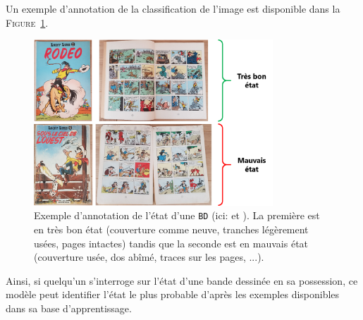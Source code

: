 			Un exemple d'annotation de la classification de l'image est disponible dans la \textsc{Figure~\ref{figure:2.1.2.B-PRESENTATION-ANNOTATION-EXEMPLES-CLASSIFICATION}}.
			\begin{leftBarExamples}
				\begin{figure}[H]
					\centering
					\includegraphics[width=0.80\textwidth]{figures/etatdelart-morris-1950-lucky-luke-2-1952-lucky-luke-4}
					\caption{
						Exemple d'annotation de l'état d'une \texttt{BD} (ici: \cite{morris-goscinny:1950:rodeo} et \cite{morris-goscinny:1952:sous-ciel-ouest}).
						La première est en très bon état (couverture comme neuve, tranches légèrement usées, pages intactes) tandis que la seconde est en mauvais état (couverture usée, dos abîmé, traces sur les pages, ...).
					}
					\label{figure:2.1.2.B-PRESENTATION-ANNOTATION-EXEMPLES-CLASSIFICATION}
				\end{figure}
			\end{leftBarExamples}
			
			Ainsi, si quelqu'un s'interroge sur l'état d'une bande dessinée en sa possession, ce modèle peut identifier l'état le plus probable d'après les exemples disponibles dans sa base d'apprentissage.
			
